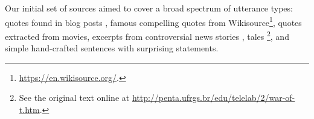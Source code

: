 \documentclass[a4paper,fleqn]{cas-dc}
\begin{document}
Our initial set of sources aimed to cover a
broad spectrum of utterance types: quotes found in blog posts
\citep{leskovec_meme-tracking_2009,lerique-2018-semantic-drift}, famous
compelling quotes from Wikisource\footnote{\url{https://en.wikisource.org/}.},
quotes extracted from movies, excerpts from controversial news stories
\citep{moussaid_amplification_2015}, tales
\citep{bartlett_remembering:_1995}\footnote{See the original text online at
\url{http://penta.ufrgs.br/edu/telelab/2/war-of-t.htm}.}, and simple
hand-crafted sentences with surprising statements.
\end{document}
